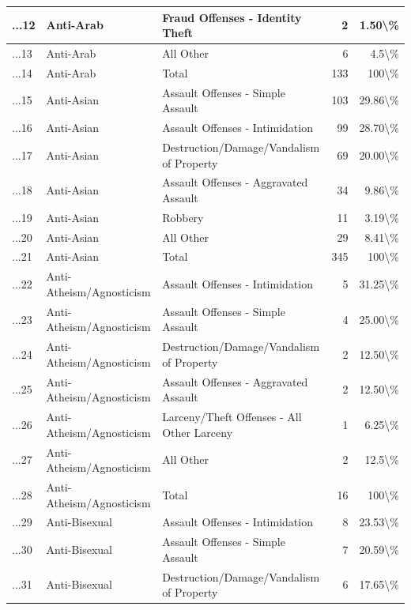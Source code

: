 \documentclass[
]{krantz}
\begin{document}
\begin{longtable}[t]{l|l|l|r|r}
\hline
...12 & Anti-Arab & Fraud Offenses - Identity Theft & 2 & 1.50\textbackslash{}\%\\
\hline
...13 & Anti-Arab & All Other & 6 & 4.5\textbackslash{}\%\\
\hline
...14 & Anti-Arab & Total & 133 & 100\textbackslash{}\%\\
\hline
...15 & Anti-Asian & Assault Offenses - Simple Assault & 103 & 29.86\textbackslash{}\%\\
\hline
...16 & Anti-Asian & Assault Offenses - Intimidation & 99 & 28.70\textbackslash{}\%\\
\hline
...17 & Anti-Asian & Destruction/Damage/Vandalism of Property & 69 & 20.00\textbackslash{}\%\\
\hline
...18 & Anti-Asian & Assault Offenses - Aggravated Assault & 34 & 9.86\textbackslash{}\%\\
\hline
...19 & Anti-Asian & Robbery & 11 & 3.19\textbackslash{}\%\\
\hline
...20 & Anti-Asian & All Other & 29 & 8.41\textbackslash{}\%\\
\hline
...21 & Anti-Asian & Total & 345 & 100\textbackslash{}\%\\
\hline
...22 & Anti-Atheism/Agnosticism & Assault Offenses - Intimidation & 5 & 31.25\textbackslash{}\%\\
\hline
...23 & Anti-Atheism/Agnosticism & Assault Offenses - Simple Assault & 4 & 25.00\textbackslash{}\%\\
\hline
...24 & Anti-Atheism/Agnosticism & Destruction/Damage/Vandalism of Property & 2 & 12.50\textbackslash{}\%\\
\hline
...25 & Anti-Atheism/Agnosticism & Assault Offenses - Aggravated Assault & 2 & 12.50\textbackslash{}\%\\
\hline
...26 & Anti-Atheism/Agnosticism & Larceny/Theft Offenses - All Other Larceny & 1 & 6.25\textbackslash{}\%\\
\hline
...27 & Anti-Atheism/Agnosticism & All Other & 2 & 12.5\textbackslash{}\%\\
\hline
...28 & Anti-Atheism/Agnosticism & Total & 16 & 100\textbackslash{}\%\\
\hline
...29 & Anti-Bisexual & Assault Offenses - Intimidation & 8 & 23.53\textbackslash{}\%\\
\hline
...30 & Anti-Bisexual & Assault Offenses - Simple Assault & 7 & 20.59\textbackslash{}\%\\
\hline
...31 & Anti-Bisexual & Destruction/Damage/Vandalism of Property & 6 & 17.65\textbackslash{}\%\\

\end{longtable}
\end{document}

